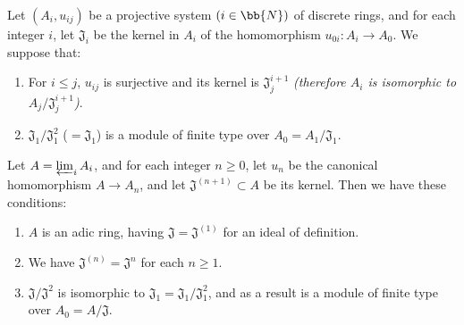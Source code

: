 \begin{proposition}[7.2.7]
\label{0.7.2.7}
Let $(A_i,u_{ij})$ be a projective system $(i\in\bb{N})$ of discrete rings, and
for each integer $i$, let $\mathfrak{J}_i$ be the kernel in $A_i$ of the
homomorphism $u_{0i}:A_i\to A_0$. We suppose that:
\begin{enumerate}
  \item[{\rm(a)}] For $i\leq j$, $u_{ij}$ is surjective and its kernel is $\mathfrak{J}_j^{i+1}$
    \emph{(therefore $A_i$ is isomorphic to $A_j/\mathfrak{J}_j^{i+1}$)}.
  \item[{\rm(b)}] $\mathfrak{J}_1/\mathfrak{J}_1^2$ ($=\mathfrak{J}_1$) is a module of
    finite type over $A_0=A_1/\mathfrak{J}_1$.
\end{enumerate}
Let $A=\varprojlim_i A_i$, and for each integer $n\geq 0$, let $u_n$ be the
canonical homomorphism $A\to A_n$, and let $\mathfrak{J}^{(n+1)}\subset A$ be
its kernel. Then we have these conditions:
\begin{enumerate}
  \item[{\rm(i)}] $A$ is an adic ring, having $\mathfrak{J}=\mathfrak{J}^{(1)}$ for an
    ideal of definition.
  \item[{\rm(ii)}] We have $\mathfrak{J}^{(n)}=\mathfrak{J}^n$ for each $n\geq 1$.
  \item[{\rm(iii)}] $\mathfrak{J}/\mathfrak{J}^2$ is isomorphic to
    $\mathfrak{J}_1=\mathfrak{J}_1/\mathfrak{J}_1^2$, and as a result is a module of finite type
    over $A_0=A/\mathfrak{J}$.
\end{enumerate}
\end{proposition}

